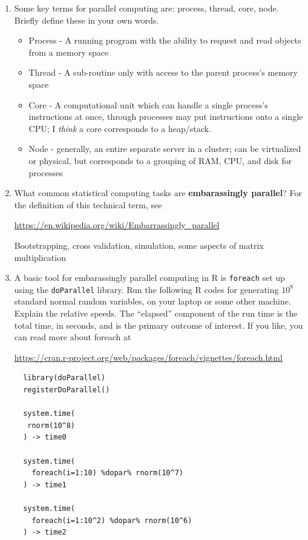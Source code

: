 \documentclass[12pt]{article}
\begin{document}
\begin{enumerate}

\item Some key terms for parallel computing are: process, thread, core, node. Briefly define these in your own words.

\begin{itemize}
    \item Process - A running program with the ability to request and read objects from a memory space
    \item Thread - A sub-routine only with access to the parent process's memory space
    \item Core - A computational unit which can handle a single process's instructions at once, through processes may put instructions onto a single CPU; I \textit{think} a core corresponds to a heap/stack.
    \item Node - generally, an entire separate server in a cluster; can be virtualized or physical, but corresponds to a grouping of RAM, CPU, and disk for processes
\end{itemize}

\item What common statistical computing tasks are {\bf embarassingly parallel}? For the definition of this technical term, see

  \url{https://en.wikipedia.org/wiki/Embarrassingly_parallel} 

Bootstrapping, cross validation, simulation, some aspects of matrix multiplication

\item A basic tool for embarassingly parallel computing in R is \texttt{foreach} set up using the \texttt{doParallel} library. Run the following R codes for generating $10^8$ standard normal random variables, on your laptop or some other machine. Explain the relative speeds. The ``elapsed'' component of the run time is the total time, in seconds, and is the primary outcome of interest. If you like, you can read more about foreach at
  
\url{https://cran.r-project.org/web/packages/foreach/vignettes/foreach.html}

\begin{verbatim} 
  library(doParallel)
  registerDoParallel()

  system.time(
   rnorm(10^8)
  ) -> time0

  system.time(
    foreach(i=1:10) %dopar% rnorm(10^7)
  ) -> time1

  system.time(
    foreach(i=1:10^2) %dopar% rnorm(10^6)
  ) -> time2


\end{verbatim}
\end{enumerate}
\end{document}
